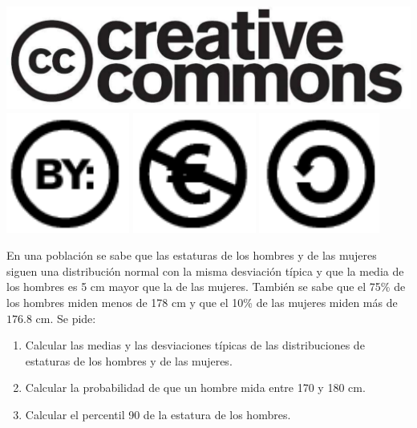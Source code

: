 \documentclass[aspectratio=149,10pt,xcolor=dvipsnames,t]{beamer}
\begin{document}
\begin{frame}[c]
\begin{center}
\biskip
\includegraphics[scale=0.07]{img/cc-logo}
\includegraphics[scale=0.2]{img/cc-by}
\includegraphics[scale=0.2]{img/cc-e}
\includegraphics[scale=0.2]{img/cc-c}
\end{center}
\end{frame}

\begin{frame}[c]
\large
En una población se sabe que las estaturas de los hombres y de las mujeres siguen una distribución
normal con la misma desviación típica y que la media de los hombres es 5 cm mayor que la de las mujeres. 
También se sabe que el 75\% de los hombres miden menos de 178 cm y que el 10\% de las mujeres miden más de $176.8$ cm. 
Se pide:
\begin{enumerate}
\item Calcular las medias y las desviaciones típicas de las distribuciones de estaturas de los hombres y de las mujeres.
\item Calcular la probabilidad de que un hombre mida entre 170 y 180 cm.
\item Calcular el percentil 90 de la estatura de los hombres. 
\end{enumerate}
\end{frame}
\end{document}
